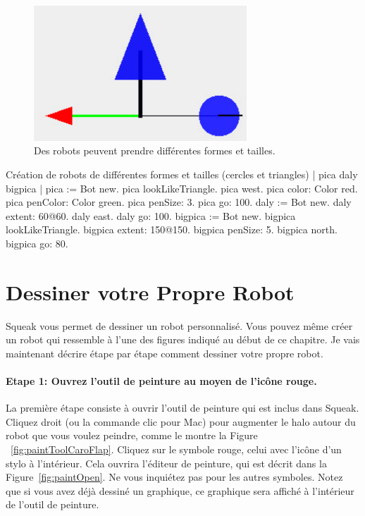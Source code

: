 \documentclass[a4paper,10pt,twoside]{book}
\begin{document}
\begin{figure}[h]
\begin{center}
\includegraphics[width=8cm]{shapeAndSize}
\caption{Des robots peuvent prendre diff\'erentes formes et tailles. \label{fig:shapeAndSize}}
\end{center}
\end{figure}


\begin{script}[shape]{Cr\'eation de robots de diff\'erentes formes et tailles (cercles et triangles)}
| pica daly bigpica | 
pica := Bot new. 
pica lookLikeTriangle. 
pica west. 
pica color: Color red. 
pica penColor: Color green. 
pica penSize: 3. 
pica go: 100. 
daly := Bot new. 
daly extent: 60@60. 
daly east. 
daly go: 100. 
bigpica := Bot new. 
bigpica lookLikeTriangle. 
bigpica extent: 150@150. 
bigpica penSize: 5. 
bigpica north. 
bigpica go: 80. 
\end{script}

\section{Dessiner votre Propre Robot}

Squeak vous permet de dessiner un robot personnalis\'e. Vous pouvez m\^eme cr\'eer un robot qui ressemble 
\`a l'une des figures indiqu\'e au d\'ebut de ce chapitre. Je vais maintenant d\'ecrire \'etape par \'etape 
comment dessiner votre propre robot. 

\paragraph{Etape 1: Ouvrez l'outil de peinture au moyen de l'icône rouge.}

La premi\`ere \'etape consiste \`a ouvrir l'outil de peinture qui est inclus dans Squeak. Cliquez droit 
(ou la commande clic pour Mac) pour augmenter le halo autour du robot que vous voulez peindre, 
comme le montre la Figure ~\ref{fig:paintToolCaroFlap}. Cliquez sur le symbole rouge, celui avec 
l'icône d'un stylo \`a l'int\'erieur. Cela ouvrira l'\'editeur de peinture, qui est d\'ecrit dans la 
Figure~\ref{fig:paintOpen}. Ne vous inqui\'etez pas pour les autres symboles. Notez que si vous 
avez d\'ej\`a dessin\'e un graphique, ce graphique sera affich\'e \`a l'int\'erieur de l'outil de peinture.
\end{document}
